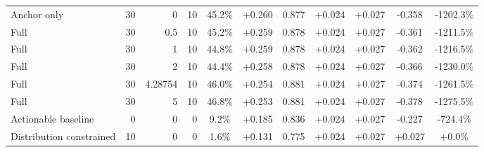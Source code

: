 \begin{table}[htbp]
\begin{tabular}{lrrrccccccc}
Anchor only & 30 & 0 & 10 & 45.2\% & +0.260 & 0.877 & +0.024 & +0.027 & -0.358 & -1202.3\% \\
Full & 30 & 0.5 & 10 & 45.2\% & +0.259 & 0.878 & +0.024 & +0.027 & -0.361 & -1211.5\% \\
Full & 30 & 1 & 10 & 44.8\% & +0.259 & 0.878 & +0.024 & +0.027 & -0.362 & -1216.5\% \\
Full & 30 & 2 & 10 & 44.4\% & +0.258 & 0.878 & +0.024 & +0.027 & -0.366 & -1230.0\% \\
Full & 30 & 4.28754 & 10 & 46.0\% & +0.254 & 0.881 & +0.024 & +0.027 & -0.374 & -1261.5\% \\
Full & 30 & 5 & 10 & 46.8\% & +0.253 & 0.881 & +0.024 & +0.027 & -0.378 & -1275.5\% \\
Actionable baseline & 0 & 0 & 0 & 9.2\% & +0.185 & 0.836 & +0.024 & +0.027 & -0.227 & -724.4\% \\
Distribution constrained & 10 & 0 & 0 & 1.6\% & +0.131 & 0.775 & +0.024 & +0.027 & +0.027 & +0.0\% \\
\bottomrule
\end{tabular}
\end{table}